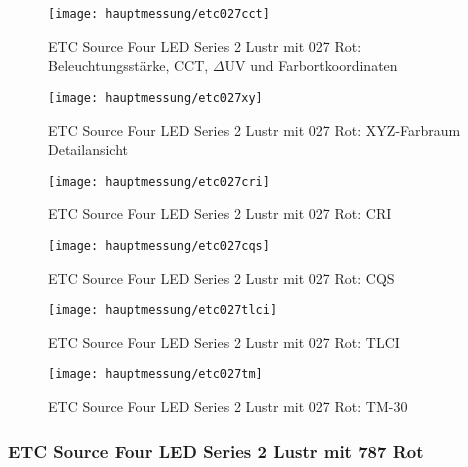 \documentclass[pagesize,paper=A4,fontsize=12pt,utf8,numbers=noenddot,bibliography=totoc,listof=totoc,DIV=11,BCOR=1mm]{scrreprt}
\begin{document}
\begin{figure}[htp]     %
\centering
\texttt{[image: hauptmessung/etc027cct]} 
\caption {ETC Source Four LED Series 2 Lustr mit 027 Rot: Beleuchtungsstärke, CCT, $\Delta$UV und Farbortkoordinaten} 
\end{figure}

\begin{figure}[htp]     %
\centering
\texttt{[image: hauptmessung/etc027xy]} 
\caption {ETC Source Four LED Series 2 Lustr mit 027 Rot: XYZ-Farbraum Detailansicht} 
\end{figure}

\begin{figure}[htp]     %
\centering
\texttt{[image: hauptmessung/etc027cri]} 
\caption {ETC Source Four LED Series 2 Lustr mit 027 Rot: CRI} 
\end{figure}

\begin{figure}[htp]     %
\centering
\texttt{[image: hauptmessung/etc027cqs]} 
\caption {ETC Source Four LED Series 2 Lustr mit 027 Rot: CQS} 
\end{figure}

\begin{figure}[htp]     %
\centering
\texttt{[image: hauptmessung/etc027tlci]} 
\caption {ETC Source Four LED Series 2 Lustr mit 027 Rot: TLCI} 
\end{figure}

\begin{figure}[htp]     %
\centering
\texttt{[image: hauptmessung/etc027tm]} 
\caption {ETC Source Four LED Series 2 Lustr mit 027 Rot: TM-30} 
\end{figure}

\subsubsection{ETC Source Four LED Series 2 Lustr mit 787 Rot}
\end{document}
